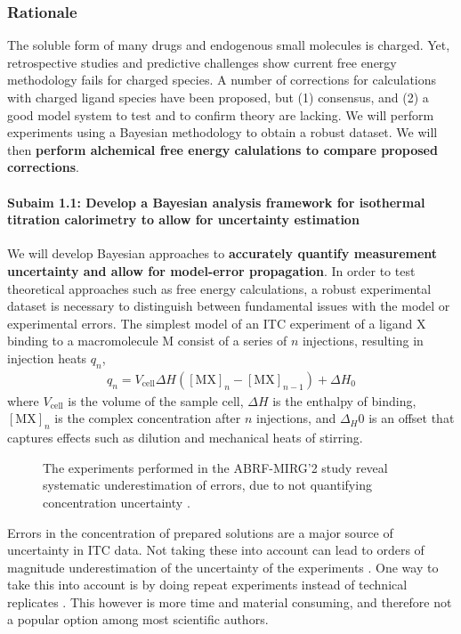 \documentclass[10pt,final]{article}
\newcommand{\subsubsubsection}[1]{\paragraph*{#1}}
\begin{document}
\subsubsection*{Rationale}
The soluble form of many drugs and endogenous small molecules is charged. Yet, retrospective studies and predictive challenges show current free energy methodology fails for charged species\cite{Rocklin2013b,Muddana2014a}.
A number of corrections for calculations with charged ligand species have been proposed, but (1) consensus, and (2) a good model system to test and to confirm theory are lacking\cite{Reif2013a,Rocklin2013a}. We will perform experiments using a Bayesian methodology to obtain a robust dataset. We will then \textbf{ perform alchemical free energy calulations to compare proposed corrections}.
\subsubsubsection{Subaim 1.1: Develop a Bayesian analysis framework for isothermal titration calorimetry to allow for uncertainty estimation}
We will develop Bayesian approaches to \textbf{accurately quantify measurement uncertainty and allow for model-error propagation}. In order to test theoretical approaches such as free energy calculations, a robust experimental dataset is necessary to distinguish between fundamental issues with the model or experimental errors.
The simplest model of an ITC experiment of a ligand $\mathrm{X}$ binding to a macromolecule $\mathrm{M}$ consist of a series of $n$ injections, resulting in injection heats $q_n$,
\begin{align}
	q_n = V_\mathrm{cell} \Delta H \left( [\mathrm{MX}]_n - [\mathrm{MX}]_{n-1} \right) + \Delta H_0 \label{equation:liberated-heat}
\end{align}
where $V_\mathrm{cell}$ is the volume of the sample cell, $\Delta H$ is the enthalpy of binding, $[\mathrm{MX}]_n$ is the complex concentration after $n$ injections, and $\Delta_H0$ is an offset that captures effects such as dilution and mechanical heats of stirring.
\begin{figure}
	\centering
	\caption{The experiments performed in the ABRF-MIRG'2 study reveal systematic underestimation of errors, due to not quantifying concentration uncertainty \cite{Myszka2003a}.}
\end{figure}
Errors in the concentration of prepared solutions are a major source of uncertainty in ITC data. Not taking these into account can lead to orders of magnitude underestimation of the uncertainty of the experiments \cite{Myszka2003a}. One way to take this into account is by doing repeat experiments instead of technical replicates \cite{Vaux2012a}. This however is more time and material consuming, and therefore not a popular option among most scientific authors. 
\end{document}
